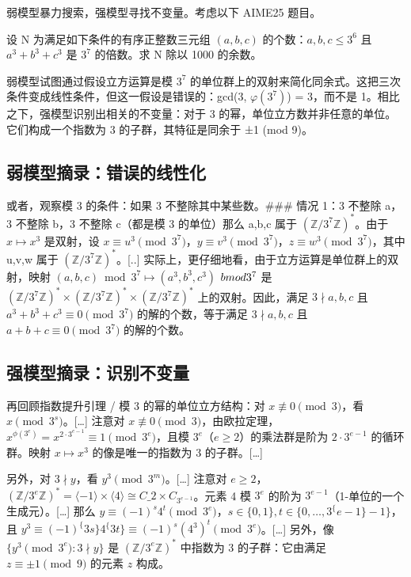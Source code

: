 \documentclass[
  10
]{article}
\begin{document}
弱模型暴力搜索，强模型寻找不变量。考虑以下 AIME25 题目。

设 N 为满足如下条件的有序正整数三元组 $(a, b, c)$ 的个数：$a, b, c \leq 3^6$ 且 $a^3 + b^3 + c^3$ 是 $3^7$ 的倍数。求 N 除以 1000 的余数。

弱模型试图通过假设立方运算是模 $3^7$ 的单位群上的双射来简化同余式。这把三次条件变成线性条件，但这一假设是错误的：gcd(3, $\varphi(3^7)$) = 3，而不是 1。相比之下，强模型识别出相关的不变量：对于 3 的幂，单位立方数并非任意的单位。它们构成一个指数为 3 的子群，其特征是同余于 ±1 (mod 9)。

\subsection{弱模型摘录：错误的线性化}\label{weak-model-excerpt-incorrect-linearization}

或者，观察模 3 的条件：如果 3 不整除其中某些数。\#\#\# 情况 1：3 不整除 a，3 不整除 b，3 不整除 c（都是模 3 的单位）那么 a,b,c 属于 $(\mathbb{Z}/3^7\mathbb{Z})^*$。由于 $x \mapsto x^3$ 是双射，设 $x \equiv u^3 \pmod{3^7}$，$y \equiv v^3 \pmod{3^7}$，$z \equiv w^3 \pmod{3^7}$，其中 u,v,w 属于 $(\mathbb{Z}/3^7\mathbb{Z})^*$。{[}..{]} 实际上，更仔细地看，由于立方运算是单位群上的双射，映射 $(a,b,c) \bmod 3^7 \mapsto (a^3,b^3,c^3)$ $\\bmod 3^7$ 是 $(\mathbb{Z}/3^7\mathbb{Z})^* \times (\mathbb{Z}/3^7\mathbb{Z})^* \times (\mathbb{Z}/3^7\mathbb{Z})^*$ 上的双射。因此，满足 $3 \nmid a,b,c$ 且 $a^3 + b^3 + c^3 \equiv 0 \pmod{3^7}$ 的解的个数，等于满足 $3 \nmid a,b,c$ 且 $a + b + c \equiv 0 \pmod{3^7}$ 的解的个数。

\subsection{强模型摘录：识别不变量}\label{strong-model-excerpt-identifying-the-invariant}

再回顾指数提升引理 / 模 3 的幂的单位立方结构：对 $x \not \equiv 0 \pmod{3}$，看 $x \pmod{3^s}$。{[}\ldots{]} 注意对 $x \not\equiv 0 \pmod{3}$，由欧拉定理，$x^{\phi(3^e)} = x^{2\cdot 3^{e-1}} \equiv 1 \pmod{3^e}$，且模 $3^e$（$e\ge2$）的乘法群是阶为 $2\cdot 3^{e-1}$ 的循环群。映射 $x \mapsto x^3$ 的像是唯一的指数为 3 的子群。{[}\ldots{]}

另外，对 $3 \nmid y$，看 $y^3 \pmod{3^m}$。{[}\ldots{]} 注意对 $e\ge2$，$(\mathbb{Z}/3^e\mathbb{Z})^* = \langle -1 \rangle \times \langle 4 \rangle \cong C\_2 \times C_{3^{e-1}}$。元素 4 模 $3^e$ 的阶为 $3^{e-1}$（1-单位的一个生成元）。{[}\ldots{]} 那么 $y \equiv (-1)^s 4^t \pmod{3^e}$，$s\in\{0,1\}, t\in\{0,\ldots,3^\{e-1\}-1\}$，且 $y^3 \equiv (-1)^\{3s\} 4^\{3t\} \equiv (-1)^s (4^3)^t \pmod{3^e}$。{[}\ldots{]} 另外，像 $\{y^3 \pmod{3^e} : 3\nmid y\}$ 是 $(\mathbb{Z}/3^e\mathbb{Z})^*$ 中指数为 3 的子群：它由满足 $z \equiv \pm 1 \pmod{9}$ 的元素 $z$ 构成。
\end{document}
